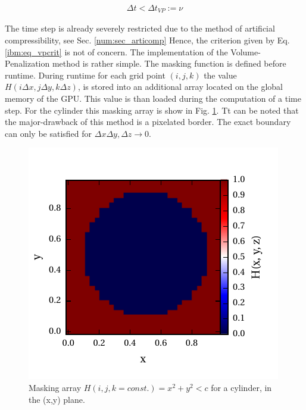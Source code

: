 \begin{align}
    \label{ibm:eq_vpcrit}
    \Delta t < \Delta t_{VP} := \nu
\end{align}

The time step is already severely restricted due to the method of artificial compressibility, see Sec. \ref{num:sec_articomp}
Hence, the criterion given by Eq. \ref{ibm:eq_vpcrit} is not of concern.
The implementation of the Volume-Penalization method is rather simple.
The masking function is defined before runtime.
During runtime for each grid point ${(i, j, k)}$ the value ${H(i\Delta x, j\Delta y, k \Delta z)}$,
is stored into an additional array located on the global memory of the GPU.
This value is than loaded during the computation of a time step.
For the cylinder this masking array is show in Fig. \ref{fig:ibm_maskvolpen}.
Tt can be noted that the major-drawback of this method is a pixelated border.
The exact boundary can only be satisfied for $\Delta x\Delta y, \Delta z \rightarrow 0$.

\begin{figure}[!t]
    \centering
    \includegraphics{gfx/immersed_boundary/methods/mask_volpen.pdf}
    \caption{Masking array $H(i,j,k=const.) = x^2 + y^2 < c$ for a cylinder, in the (x,y) plane.}
    \label{fig:ibm_maskvolpen}
\end{figure}

